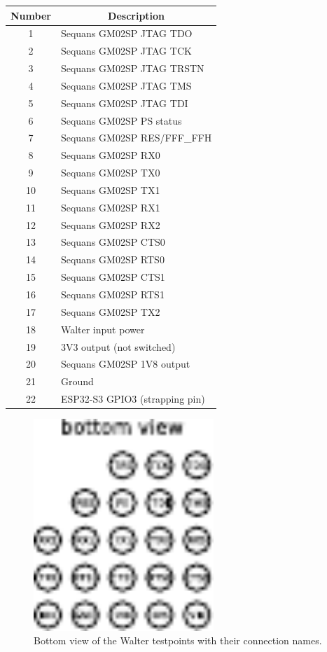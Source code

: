 \documentclass[11pt]{article}
\begin{document}
\begin{center}
\begin{tabular}{|c|p{9.5cm}|}
    \hline
    {\bf Number} & \multicolumn{1}{c|}{\bf Description} \\
    \hline
    \hline
    1 & Sequans GM02SP JTAG TDO\\
    \hline
    2 & Sequans GM02SP JTAG TCK\\
    \hline
    3 & Sequans GM02SP JTAG TRSTN\\
    \hline
    4 & Sequans GM02SP JTAG TMS\\
    \hline
    5 & Sequans GM02SP JTAG TDI\\
    \hline
    6 & Sequans GM02SP PS status\\
    \hline
    7 & Sequans GM02SP RES/FFF\_FFH \\
    \hline
    8 & Sequans GM02SP RX0 \\
    \hline
    9 & Sequans GM02SP TX0 \\
    \hline
    10 & Sequans GM02SP TX1 \\
    \hline
    11 & Sequans GM02SP RX1 \\
    \hline
    12 & Sequans GM02SP RX2 \\
    \hline
    13 & Sequans GM02SP CTS0 \\
    \hline
    14 & Sequans GM02SP RTS0 \\ 
    \hline
    15 & Sequans GM02SP CTS1 \\
    \hline
    16 & Sequans GM02SP RTS1 \\
    \hline
    17 & Sequans GM02SP TX2 \\
    \hline
    18 & Walter input power \\
    \hline
    19 & 3V3 output (not switched) \\
    \hline
    20 & Sequans GM02SP 1V8 output \\
    \hline
    21 & Ground \\
    \hline
    22 & ESP32-S3 GPIO3 (strapping pin)\\
    \hline
\end{tabular}
\end{center}

\begin{figure}[h]
    \centering
    \includegraphics[height=8cm]{walter-testpoints-named.pdf}
    \caption{Bottom view of the Walter testpoints with their connection names.}
    \label{fig:testpoints}
\end{figure}
\end{document}
